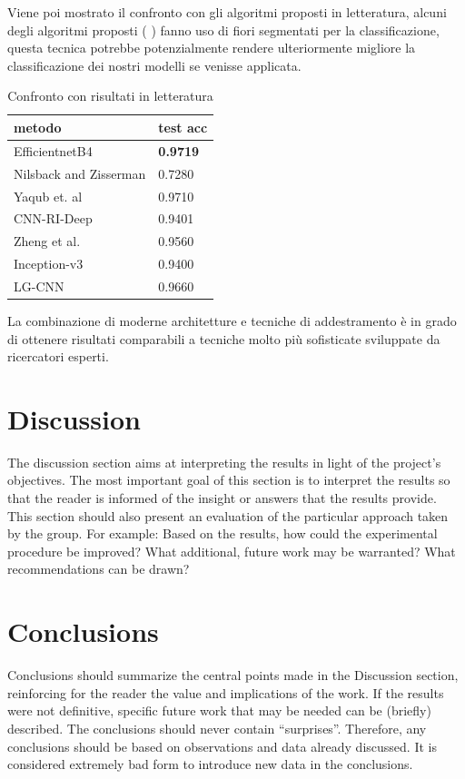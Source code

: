 Viene poi mostrato il confronto con gli algoritmi proposti in letteratura, alcuni degli algoritmi proposti (\cite{Nilsback08} \cite{yaqub} \cite{XIE2017118}) fanno uso di fiori segmentati per la classificazione, questa tecnica potrebbe potenzialmente rendere ulteriormente migliore la classificazione dei nostri modelli se venisse applicata.
\begin{table}[H]
\centering
\caption{Confronto con risultati in letteratura}
\begin{tabular}{|l|l|}
\hline
\textbf{metodo}                                           & \textbf{test acc} \\ \hline
EfficientnetB4                                            & \textbf{0.9719}           \\ \hline
Nilsback and Zisserman \cite{Nilsback08} & 0.7280            \\ \hline
Yaqub et. al \cite{yaqub}                & 0.9710            \\ \hline
CNN-RI-Deep \cite{Xie2016TowardsRI}      & 0.9401            \\ \hline
Zheng et al. \cite{zheng2016good}        & 0.9560            \\ \hline
Inception-v3 \cite{7984661}              & 0.9400            \\ \hline
LG-CNN \cite{XIE2017118}                 & 0.9660            \\ \hline
\end{tabular}
\label{t_conf}
\end{table}
La combinazione di moderne architetture e tecniche di addestramento è in grado di ottenere risultati comparabili a tecniche molto più sofisticate sviluppate da ricercatori esperti.
\section{Discussion}
The discussion section aims at interpreting the results in light of the project's objectives. The most important goal of this section is to interpret the results so that the reader is informed of the insight or answers that the results provide. This section should also present an evaluation of the particular approach taken by the group. For example: Based on the results, how could the experimental procedure be improved? What additional, future work may be warranted? What recommendations can be drawn?


\section{Conclusions}
Conclusions should summarize the central points made in the Discussion section, reinforcing for the reader the value and implications of the work. If the results were not definitive, specific future work that may be needed can be (briefly) described. The conclusions should never contain ``surprises''. Therefore, any conclusions should be based on observations and data already discussed. It is considered extremely bad form to introduce new data in the conclusions.

